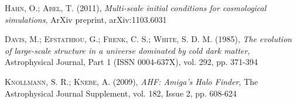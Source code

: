 \documentclass[a4paper,openright,12pt]{book}
\begin{document}
\begin{thebibliography}{a}
 \textsc{Hahn, O.; Abel, T. (2011)},
\textit{Multi-scale initial conditions for cosmological simulations},
ArXiv preprint, arXiv:1103.6031

 \textsc{Davis, M.; Efstathiou, G.; Frenk, C. S.; White, S. D. M. (1985)},
\textit{The evolution of large-scale structure in a universe dominated by cold dark matter},
Astrophysical Journal, Part 1 (ISSN 0004-637X), vol. 292, pp. 371-394 

 \textsc{Knollmann, S. R.; Knebe, A. (2009)},
\textit{AHF: Amiga's Halo Finder},
The Astrophysical Journal Supplement, vol. 182, Issue 2, pp. 608-624
 
\end{thebibliography}
\end{document}
